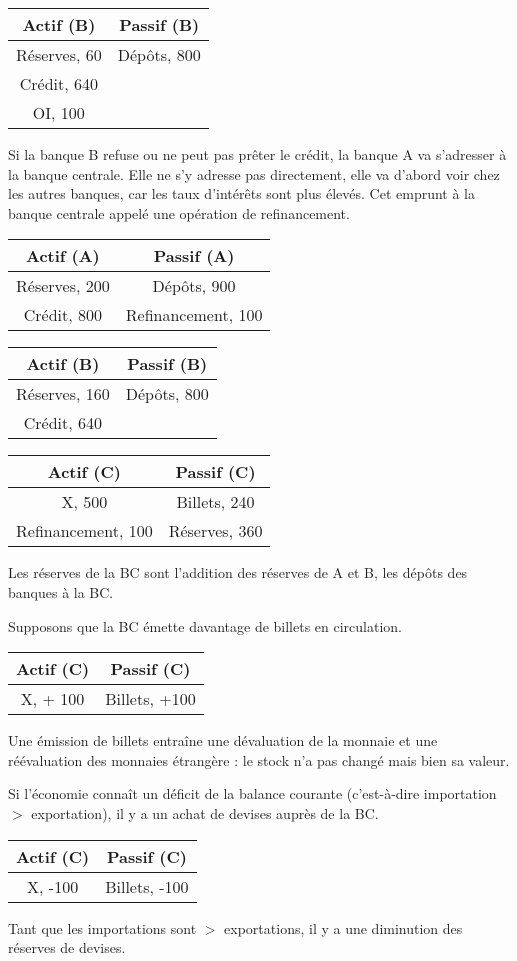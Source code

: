 	\begin{tabular}{c|c}
	Actif (B) & Passif (B) \\ 
	\hline 
	Réserves, 60 & Dépôts, 800 \\ 
	Crédit, 640 &  \\
	OI, 100 &
	\end{tabular}
	
	Si la banque B refuse ou ne peut pas prêter le crédit, la banque A va s'adresser à la banque centrale. Elle ne s'y adresse pas directement, elle va d'abord voir chez les autres banques, car les taux d'intérêts sont plus élevés. Cet emprunt à la banque centrale appelé une opération de refinancement.
	
	\begin{tabular}{c|c}
	Actif (A) & Passif (A) \\ 
	\hline 
	Réserves, 200 & Dépôts, 900 \\ 
	Crédit, 800 &   Refinancement, 100
	\end{tabular}
	
		
	\begin{tabular}{c|c}
	Actif (B) & Passif (B) \\ 
	\hline 
	Réserves, 160 & Dépôts, 800 \\ 
	Crédit, 640 &
	\end{tabular}
	
	
	\begin{tabular}{c|c}
	Actif (C) & Passif (C) \\ 
	\hline 
	X, 500 & Billets, 240 \\ 
	Refinancement, 100 & Réserves, 360 \\
	\end{tabular}
	
	Les réserves de la BC sont l'addition des réserves de A et B, les dépôts des banques à la BC.
	
	Supposons que la BC émette davantage de billets en circulation.
	
	\begin{tabular}{c|c}
	Actif (C) & Passif (C) \\ 
	\hline 
	X, + 100 & Billets, +100 
	\end{tabular}
	
	Une émission de billets entraîne une dévaluation de la monnaie et une réévaluation des monnaies étrangère : le stock n'a pas changé mais bien sa valeur.
	
	Si l'économie connaît un déficit de la balance courante (c'est-à-dire importation $>$ exportation), il y a un achat de devises auprès de la BC.
	
	\begin{tabular}{c|c}
	Actif (C) & Passif (C) \\ 
	\hline 
	X, -100 & Billets, -100
	\end{tabular}
	
	Tant que les importations sont $>$ exportations, il y a une diminution des réserves de devises.